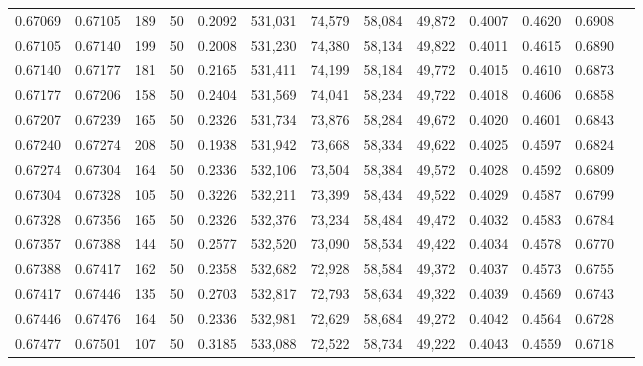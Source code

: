 \begin{tabular}{rrrrrrrrrrrrr}
0.67069 & 0.67105 &   189 &  50 &                                     0.2092 & 531,031 &  74,579 &  58,084 &  49,872 & 0.4007 & 0.4620 & 0.6908 \\
0.67105 & 0.67140 &   199 &  50 &                                     0.2008 & 531,230 &  74,380 &  58,134 &  49,822 & 0.4011 & 0.4615 & 0.6890 \\
0.67140 & 0.67177 &   181 &  50 &                                     0.2165 & 531,411 &  74,199 &  58,184 &  49,772 & 0.4015 & 0.4610 & 0.6873 \\
0.67177 & 0.67206 &   158 &  50 &                                     0.2404 & 531,569 &  74,041 &  58,234 &  49,722 & 0.4018 & 0.4606 & 0.6858 \\
0.67207 & 0.67239 &   165 &  50 &                                     0.2326 & 531,734 &  73,876 &  58,284 &  49,672 & 0.4020 & 0.4601 & 0.6843 \\
0.67240 & 0.67274 &   208 &  50 &                                     0.1938 & 531,942 &  73,668 &  58,334 &  49,622 & 0.4025 & 0.4597 & 0.6824 \\
0.67274 & 0.67304 &   164 &  50 &                                     0.2336 & 532,106 &  73,504 &  58,384 &  49,572 & 0.4028 & 0.4592 & 0.6809 \\
0.67304 & 0.67328 &   105 &  50 &                                     0.3226 & 532,211 &  73,399 &  58,434 &  49,522 & 0.4029 & 0.4587 & 0.6799 \\
0.67328 & 0.67356 &   165 &  50 &                                     0.2326 & 532,376 &  73,234 &  58,484 &  49,472 & 0.4032 & 0.4583 & 0.6784 \\
0.67357 & 0.67388 &   144 &  50 &                                     0.2577 & 532,520 &  73,090 &  58,534 &  49,422 & 0.4034 & 0.4578 & 0.6770 \\
0.67388 & 0.67417 &   162 &  50 &                                     0.2358 & 532,682 &  72,928 &  58,584 &  49,372 & 0.4037 & 0.4573 & 0.6755 \\
0.67417 & 0.67446 &   135 &  50 &                                     0.2703 & 532,817 &  72,793 &  58,634 &  49,322 & 0.4039 & 0.4569 & 0.6743 \\
0.67446 & 0.67476 &   164 &  50 &                                     0.2336 & 532,981 &  72,629 &  58,684 &  49,272 & 0.4042 & 0.4564 & 0.6728 \\
0.67477 & 0.67501 &   107 &  50 &                                     0.3185 & 533,088 &  72,522 &  58,734 &  49,222 & 0.4043 & 0.4559 & 0.6718 \\

\end{tabular}
